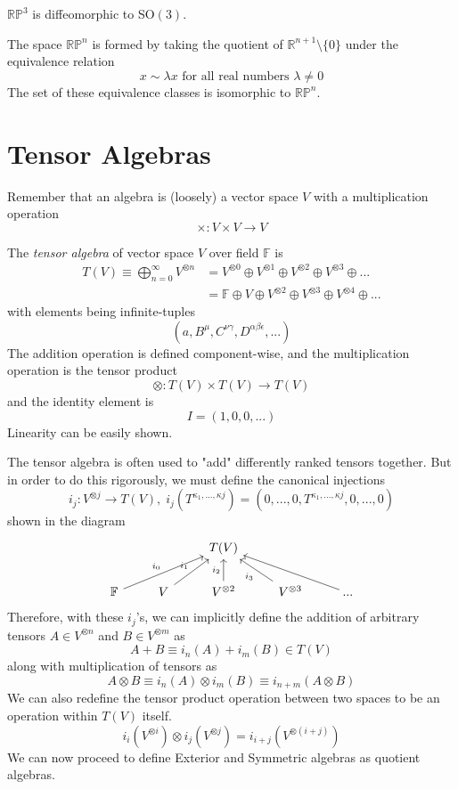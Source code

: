 \documentclass{article}
\begin{document}
    \begin{example}
    $\mathbb{RP}^3$ is diffeomorphic to SO$(3)$. 
    \end{example}

    \begin{example}
    The space $\mathbb{RP}^n$ is formed by taking the quotient of $\mathbb{R}^{n+1} \setminus \{0\}$ under the equivalence relation 
    \[x \sim \lambda x \text{ for all real numbers } \lambda \neq 0\]
    The set of these equivalence classes is isomorphic to $\mathbb{RP}^n$. 
    \end{example}

\section{Tensor Algebras}

  Remember that an algebra is (loosely) a vector space $V$ with a multiplication operation
  \[\times: V \times V \longrightarrow V\]
  \begin{definition}
  The \textit{tensor algebra} of vector space $V$ over field $\mathbb{F}$ is 
  \begin{align*}
      T(V) \equiv \bigoplus_{n = 0}^{\infty} V^{\otimes n} & = V^{\otimes 0} \oplus V^{\otimes 1} \oplus V^{\otimes 2} \oplus V^{\otimes 3} \oplus ... \\
      & = \mathbb{F} \oplus V \oplus V^{\otimes 2} \oplus V^{\otimes 3} \oplus V^{\otimes 4} \oplus ...
  \end{align*}
  with elements being infinite-tuples
  \[ (a, B^\mu, C^{\nu \gamma}, D^{\alpha \beta \epsilon}, ...)\]
  The addition operation is defined component-wise, and the multiplication operation is the tensor product 
  \[\otimes: T(V) \times T(V) \longrightarrow T(V)\]
  and the identity element is
  \[I = (1, 0, 0, ...) \]
  Linearity can be easily shown. 
  \end{definition}

  The tensor algebra is often used to "add" differently ranked tensors together. But in order to do this rigorously, we must define the canonical injections
  \[i_j: V^{\otimes j} \longrightarrow T(V), \; i_j (T^{\kappa_1, ..., \kappa j}) = (0, ...,0, T^{\kappa_1, ..., \kappa j}, 0, ..., 0) \]
  shown in the diagram
  \[\begin{tikzcd}
      & & T(V) & & \\
      \mathbb{F} \arrow{urr}{i_0} & V \arrow{ur}{i_1} & V^{\otimes 2} \arrow{u}{i_2} & V^{\otimes 3} \arrow{ul}{i_3} & ... \arrow{ull}
  \end{tikzcd}\]
  Therefore, with these $i_j$'s, we can implicitly define the addition of arbitrary tensors $A \in V^{\otimes n}$ and $B \in V^{\otimes m}$ as 
  \[ A + B \equiv i_n (A) + i_m (B) \in T(V)\]
  along with multiplication of tensors as
  \[ A \otimes B \equiv i_n(A) \otimes i_m(B) \equiv i_{n+m} (A \otimes B)\]
  We can also redefine the tensor product operation between two spaces to be an operation within $T(V)$ itself. 
  \[i_i(V^{\otimes i}) \otimes i_j( V^{\otimes j}) = i_{i+j} (V^{\otimes (i+j)})\]
  We can now proceed to define Exterior and Symmetric algebras as quotient algebras. 
\end{document}
